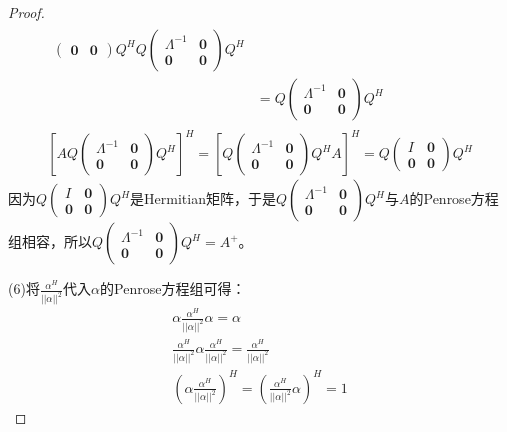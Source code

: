 \begin{proof}
\begin{gather*}
\begin{aligned}
\begin{pmatrix}
				\mathbf{0} & \mathbf{0}
			\end{pmatrix}
			Q^HQ
			\begin{pmatrix}
				\varLambda^{-1} & \mathbf{0} \\
				\mathbf{0} & \mathbf{0}
			\end{pmatrix}
			Q^H \\
			&=Q
			\begin{pmatrix}
				\varLambda^{-1} & \mathbf{0} \\
				\mathbf{0} & \mathbf{0}
			\end{pmatrix}
			Q^H
		\end{aligned} \\
		\left[AQ
		\begin{pmatrix}
			\varLambda^{-1} & \mathbf{0} \\
			\mathbf{0} & \mathbf{0}
		\end{pmatrix}
		Q^H\right]^H
		=
		\left[Q
		\begin{pmatrix}
			\varLambda^{-1} & \mathbf{0} \\
			\mathbf{0} & \mathbf{0}
		\end{pmatrix}
		Q^HA\right]^H
		=Q
		\begin{pmatrix}
			I & \mathbf{0} \\
			\mathbf{0} & \mathbf{0}
		\end{pmatrix}
		Q^H
	\end{gather*}
	因为$Q
	\begin{pmatrix}
		I & \mathbf{0} \\
		\mathbf{0} & \mathbf{0}
	\end{pmatrix}
	Q^H$是Hermitian矩阵，于是$Q
	\begin{pmatrix}
		\varLambda^{-1} & \mathbf{0} \\
		\mathbf{0} & \mathbf{0}
	\end{pmatrix}Q^H$与$A$的Penrose方程组相容，所以$Q
	\begin{pmatrix}
	\varLambda^{-1} & \mathbf{0} \\
	\mathbf{0} & \mathbf{0}
	\end{pmatrix}Q^H=A^+$。\par
	(6)将$\frac{\alpha^H}{||\alpha||^2}$代入$\alpha$的Penrose方程组可得：
	\begin{gather*}
		\alpha\frac{\alpha^H}{||\alpha||^2}\alpha=\alpha  \\
		\frac{\alpha^H}{||\alpha||^2}\alpha\frac{\alpha^H}{||\alpha||^2}=\frac{\alpha^H}{||\alpha||^2} \\
		\left(\alpha\frac{\alpha^H}{||\alpha||^2}\right)^H=\left(\frac{\alpha^H}{||\alpha||^2}\alpha\right)^H=1

\end{gather*}
\end{proof}
